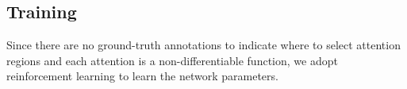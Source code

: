 \documentclass[10pt,twocolumn,letterpaper]{article}
\begin{document}





\subsection{Training}

Since there are no ground-truth annotations to indicate where to select attention regions and each attention is a non-differentiable function, we adopt reinforcement learning to learn the network parameters.
\end{document}

